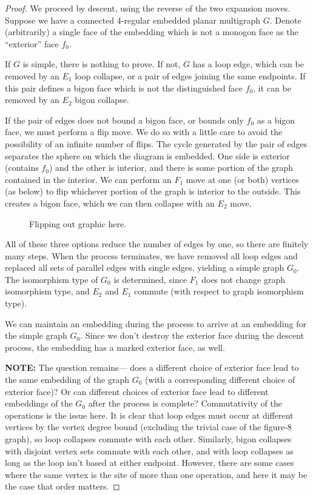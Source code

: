 \documentclass[amsmath,secnumarabic,floatfix,amssymb,nofootinbib,nobibnotes,letterpaper,11pt,tightenlines,showkeys]{revtex4}
\theoremstyle{definition}
\newcommand{\EOne}{E_1}
\newcommand{\ETwo}{E_2}
\newcommand{\FOne}{F_1}
\begin{document}
\begin{proof} 
We proceed by descent, using the reverse of the two expansion moves. Suppose we have a connected $4$-regular embedded planar multigraph $G$. Denote (arbitrarily) a single face of the embedding which is not a monogon face as the ``exterior'' face $f_0$. 

If $G$ is simple, there is nothing to prove. If not, $G$ has a loop edge, which can be removed by an $\EOne$ loop collapse, or a pair of edges joining the same endpoints. If this pair defines a bigon face which is not the distinguished face $f_0$, it can be removed by an $\ETwo$ bigon collapse. 

If the pair of edges does not bound a bigon face, or bounds only $f_0$ as a bigon face, we must perform a flip move. We do so with a little care to avoid the possibility of an infinite number of flips. The cycle generated by the pair of edges separates the sphere on which the diagram is embedded. One side is exterior (contains $f_0$) and the other is interior, and there is some portion of the graph contained in the interior. We can perform an $\FOne$ move at one (or both) vertices (as below) to flip whichever portion of the graph is interior to the outside. This creates a bigon face, which we can then collapse with an $\ETwo$ move.

\begin{figure}[h]
\begin{center}
Flipping out graphic here. 
\end{center}
\end{figure}

All of these three options reduce the number of edges by one, so there are finitely many steps.
When the process terminates, we have removed all loop edges and replaced all sets of parallel edges with single edges, yielding a simple graph $G_0$. The isomorphism type of $G_0$ is determined, since $\FOne$ does not change graph isomorphism type, and $\ETwo$ and $\EOne$ commute (with respect to graph isomorphism type).

We can maintain an embedding during the process to arrive at an embedding for the simple graph $G_0$. Since we don't destroy the exterior face during the descent process, the embedding has a marked exterior face, as well. 

\textbf{NOTE:} The question remains--- does a different choice of exterior face lead to the same embedding of the graph $G_0$ (with a corresponding different choice of exterior face)? Or can different choices of exterior face lead to different embeddings of the $G_0$ after the process is complete? Commutativity of the operations is the issue here. It is clear that loop edges must occur at different vertices by the vertex degree bound (excluding the trivial case of the figure-$8$ graph), so loop collapses commute with each other. Similarly, bigon collapses with disjoint vertex sets commute with each other, and with loop collapses as long as the loop isn't based at either endpoint. However, there are some cases where the same vertex is the site of more than one operation, and here it may be the case that order matters.  


\end{proof}
\end{document}
